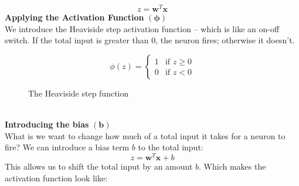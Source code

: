 \documentclass[9pt]{extarticle}
\theoremstyle{plain}
\theoremstyle{definition}
\theoremstyle{remark}
\begin{document}
$$z = \mathbf{w}^T \mathbf{x}$$
\textbf{Applying the Activation Function} $\boldsymbol{(\phi)}$\\[2ex]
We introduce the Heaviside step activation function – which is like an on-off switch. If the total input is greater than $0$, the neuron fires; otherwise it doesn't.
\begin{figure}[h]
    \centering
    \begin{subfigure}[c]{0.49\textwidth}
        \centering
        $$\phi(z) = \begin{cases}
                1 & \text{if } z \geq 0 \\
                0 & \text{if } z < 0
            \end{cases}
        $$
    \end{subfigure}
    \begin{subfigure}[c]{0.5\textwidth}
        \centering
    \end{subfigure}
    \caption{The Heaviside step function}
\end{figure} \\
\textbf{Introducing the bias} $\boldsymbol{(b)}$\\[2ex]
What is we want to change how much of a total input it takes for a neuron to fire? We can introduce a bias term $b$ to the total input:
$$z = \mathbf{w}^T \mathbf{x} + b$$
This allows us to shift the total input by an amount $b$. Which makes the activation function look like:
\end{document}
